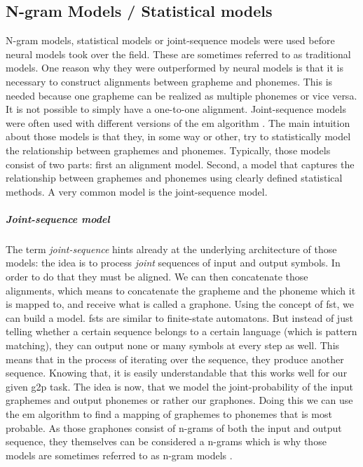 \subsection{N-gram Models / Statistical models}
N-gram models, statistical models or joint-sequence models were used before neural models took over the field. These are sometimes referred to as traditional models. One reason why they were outperformed by neural models is that it is necessary to construct alignments between grapheme and phonemes. This is needed because one grapheme can be realized as multiple phonemes or vice versa. It is not possible to simply have a one-to-one alignment. Joint-sequence models were often used with different versions of the \acf{em} algorithm \citep{lo-nicolai-2021-linguistic}. The main intuition about those models is that they, in some way or other, try to statistically model the relationship between graphemes and phonemes. Typically, those models consist of two parts: first an alignment model. Second, a model that captures the relationship between graphemes and phonemes using clearly defined statistical methods. A very common model is the joint-sequence model.

\subparagraph{Joint-sequence model} The term \textit{joint-sequence} hints already at the underlying architecture of those models: the idea is to process \textit{joint} sequences of input and output symbols. In order to do that they must be aligned. We can then concatenate those alignments, which means to concatenate the grapheme and the phoneme which it is mapped to, and receive what is called a graphone. Using the concept of \ac{fst}, we can build a model. \acp{fst} are similar to finite-state automatons. But instead of just telling whether a certain sequence belongs to a certain language (which is pattern matching), they can output none or many symbols at every step as well. This means that in the process of iterating over the sequence, they produce another sequence. Knowing that, it is easily understandable that this works well for our given \ac{g2p} task. The idea is now, that we model the joint-probability of the input graphemes and output phonemes or rather our graphones. Doing this we can use the \ac{em} algorithm to find a mapping of graphemes to phonemes that is most probable. As those graphones consist of n-grams of both the input and output sequence, they themselves can be considered a n-grams which is why those models are sometimes referred to as n-gram models \citep{ney-joint-sequence2008, lo-nicolai-2021-linguistic}.


